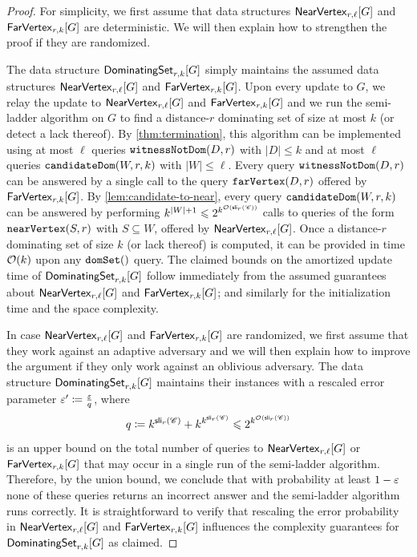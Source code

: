 \begin{proof}
	For simplicity, we first assume that data structures $\nearVertexDS{G}{r,\ell}$ and $\farVertexDS{G}{r,k}$ are deterministic. We will then explain how to strengthen the proof if they are randomized.
	
	The data structure $\dominatingSetDS{G}{r,k}$ simply maintains the assumed data structures $\nearVertexDS{G}{r,\ell}$ and $\farVertexDS{G}{r,k}$. Upon every update to $G$, we relay the update to $\nearVertexDS{G}{r,\ell}$ and $\farVertexDS{G}{r,k}$ and we run the semi-ladder algorithm on $G$ to find a distance-$r$ dominating set of size at most $k$ (or detect a lack thereof). By \cref{thm:termination}, this algorithm can be implemented using at most $\ell$ queries $\notDominated{D,r}$ with $|D|\leq k$ and at most $\ell$ queries $\candidate{W,r,k}$ with $|W|\leq \ell$. Every query $\notDominated{D,r}$ can be answered by a single call to the query $\far{D,r}$ offered by $\farVertexDS{G}{r,k}$. By \cref{lem:candidate-to-near}, every query $\candidate{W,r,k}$ can be answered by performing $k^{|W|+1}\leq 2^{k^{\Oh(\sli_r(\Cc))}}$ calls to queries of the form $\near{S,r}$ with $S\subseteq W$, offered by $\nearVertexDS{G}{r,\ell}$. Once a distance-$r$ dominating set of size $k$ (or lack thereof) is computed, it can be provided in time $\Oh(k)$ upon any $\ds{}$ query.
	The claimed bounds on the amortized update time of $\dominatingSetDS{G}{r,k}$ follow immediately from the assumed guarantees about $\nearVertexDS{G}{r,\ell}$ and $\farVertexDS{G}{r,k}$; and similarly for the initialization time and the space complexity.
	
	In case $\nearVertexDS{G}{r,\ell}$ and $\farVertexDS{G}{r,k}$ are randomized, we first assume that they work against an adaptive adversary and we will then explain how to improve the argument if they only work against an oblivious adversary. The data structure $\dominatingSetDS{G}{r,k}$ maintains their instances with a rescaled error parameter $\eps'\coloneqq \tfrac{\eps}{q}$, where
	\[q\coloneqq k^{\sli_r(\Cc)}+k^{k^{\sli_r(\Cc)}}\leq 2^{k^{\Oh(\sli_r(\Cc))}}\]
	is an upper bound on the total number of queries to $\nearVertexDS{G}{r,\ell}$ or $\farVertexDS{G}{r,k}$ that may occur in a single run of the semi-ladder algorithm. Therefore, by the union bound, we conclude that with probability at least $1-\eps$ none of these queries returns an incorrect answer and the semi-ladder algorithm runs correctly. It is straightforward to verify that rescaling the error probability in $\nearVertexDS{G}{r,\ell}$ and $\farVertexDS{G}{r,k}$ influences the complexity guarantees for $\dominatingSetDS{G}{r,k}$ as claimed.
	


\end{proof}
